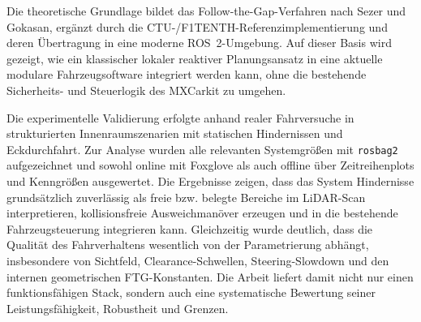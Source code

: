 \documentclass[12pt]{report}
\begin{document}
Die theoretische Grundlage bildet das Follow-the-Gap-Verfahren nach Sezer und Gokasan, ergänzt durch die CTU-/F1TENTH-Referenzimplementierung und deren Übertragung in eine moderne ROS~2-Umgebung. Auf dieser Basis wird gezeigt, wie ein klassischer lokaler reaktiver Planungsansatz in eine aktuelle modulare Fahrzeugsoftware integriert werden kann, ohne die bestehende Sicherheits- und Steuerlogik des MXCarkit zu umgehen.

Die experimentelle Validierung erfolgte anhand realer Fahrversuche in strukturierten Innenraumszenarien mit statischen Hindernissen und Eckdurchfahrt. Zur Analyse wurden alle relevanten Systemgrößen mit \texttt{rosbag2} aufgezeichnet und sowohl online mit Foxglove als auch offline über Zeitreihenplots und Kenngrößen ausgewertet. Die Ergebnisse zeigen, dass das System Hindernisse grundsätzlich zuverlässig als freie bzw. belegte Bereiche im LiDAR-Scan interpretieren, kollisionsfreie Ausweichmanöver erzeugen und in die bestehende Fahrzeugsteuerung integrieren kann. Gleichzeitig wurde deutlich, dass die Qualität des Fahrverhaltens wesentlich von der Parametrierung abhängt, insbesondere von Sichtfeld, Clearance-Schwellen, Steering-Slowdown und den internen geometrischen FTG-Konstanten. Die Arbeit liefert damit nicht nur einen funktionsfähigen Stack, sondern auch eine systematische Bewertung seiner Leistungsfähigkeit, Robustheit und Grenzen.
\bigskip


\setcounter{page}{2}
\tableofcontents
\newpage
\listoffigures
\newpage
\listoftables
\newpage






\end{document}
